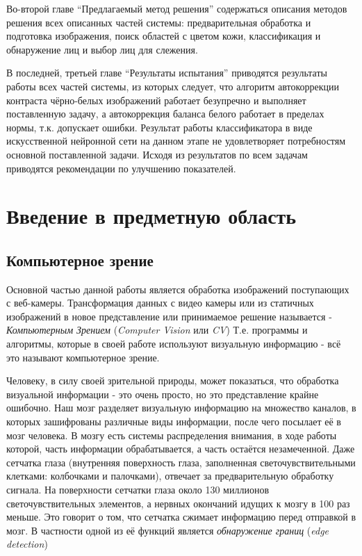 \documentclass[12pt]{report}
\begin{document}
Во-второй главе ``Предлагаемый метод решения'' содержаться описания методов решения всех описанных частей системы: 
предварительная обработка и подготовка изображения, поиск областей с цветом кожи, классификация и обнаружение лиц и 
выбор лиц для слежения.

В последней, третьей главе ``Результаты испытания'' приводятся результаты работы всех частей системы, из которых 
следует, что алгоритм автокоррекции контраста чёрно-белых изображений работает безупречно и выполняет поставленную 
задачу, а автокоррекция баланса белого работает в пределах нормы, т.к. допускает ошибки. Результат работы 
классификатора в виде искусственной нейронной сети на данном этапе не удовлетворяет потребностям основной 
поставленной задачи. Исходя из результатов по всем задачам приводятся рекомендации по улучшению показателей. 

\chapter{Введение в предметную область}
\thispagestyle{fancy}

\section{Компьютерное зрение}

Основной частью данной работы является обработка изображений поступающих с веб-камеры. Трансформация данных с видео 
камеры или из статичных изображений в новое представление или принимаемое решение называется - \emph{Компьютерным 
Зрением} (\textit{Computer Vision} или \textit{CV})\citep{bradski2008learning} Т.е. программы и алгоритмы, которые 
в 
своей работе используют визуальную информацию - всё это называют компьютерное зрение.

Человеку, в силу своей зрительной природы, может показаться, что обработка визуальной информации - это очень 
просто, 
но это представление крайне ошибочно. Наш мозг разделяет визуальную информацию на множество каналов, в которых 
зашифрованы различные виды информации, после чего посылает её в мозг человека. В мозгу есть системы распределения 
внимания, в 
ходе работы которой, часть информации обрабатывается, а часть остаётся незамеченной. \citep{bradski2008learning} 
Даже 
сетчатка глаза (внутренняя поверхность глаза, заполненная светочувствительными клетками: колбочками и палочками), 
отвечает за предварительную обработку сигнала. На поверхности сетчатки глаза около 130 миллионов 
светочувствительных 
элементов, а нервных окончаний идущих к мозгу в 100 раз меньше. Это говорит о том, что сетчатка сжимает информацию 
перед отправкой в мозг. В 
частности одной из её функций является \emph{обнаружение границ} (\textit{edge detection}) \citep{RetinaOnWiki}
\end{document}
